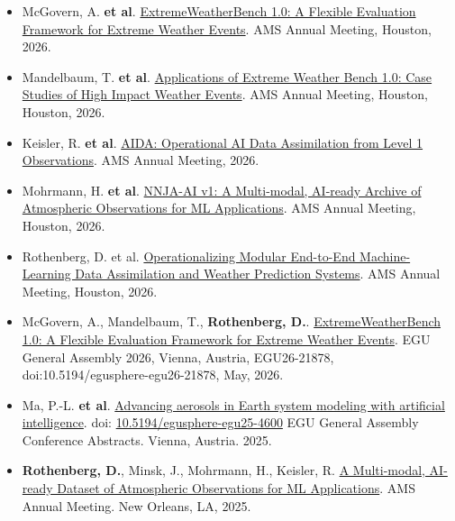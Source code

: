 \documentclass[11pt,letterpaper]{article}
\begin{document}
\begin{itemize}[itemindent=-10pt]

 \item McGovern, A. \textbf{et al}. \href{https://ams.confex.com/ams/106ANNUAL/meetingapp.cgi/Paper/477140}{ExtremeWeatherBench 1.0: A Flexible Evaluation Framework for Extreme Weather Events}. AMS Annual Meeting, Houston, 2026.
 
 \item Mandelbaum, T. \textbf{et al}. \href{https://ams.confex.com/ams/106ANNUAL/meetingapp.cgi/Paper/477141}{Applications of Extreme Weather Bench 1.0: Case Studies of High Impact Weather Events}. AMS Annual Meeting, Houston, Houston, 2026.

 \item Keisler, R. \textbf{et al}. \href{https://ams.confex.com/ams/106ANNUAL/meetingapp.cgi/Paper/473928}{AIDA: Operational AI Data Assimilation from Level 1 Observations}. AMS Annual Meeting, 2026.

 \item Mohrmann, H. \textbf{et al}. \href{https://ams.confex.com/ams/106ANNUAL/meetingapp.cgi/Paper/474971}{NNJA-AI v1: A Multi-modal, AI-ready Archive of Atmospheric Observations for ML Applications}. AMS Annual Meeting, Houston, 2026.

 \item Rothenberg, D. et al. \href{https://ams.confex.com/ams/106ANNUAL/meetingapp.cgi/Paper/476442}{Operationalizing Modular End-to-End Machine-Learning Data Assimilation and Weather Prediction Systems}. AMS Annual Meeting, Houston, 2026.

 \item McGovern, A., Mandelbaum, T., \textbf{Rothenberg, D.}. \href{https://meetingorganizer.copernicus.org/EGU26/EGU26-21878.html}{ExtremeWeatherBench 1.0: A Flexible Evaluation Framework for Extreme Weather Events}. EGU General Assembly 2026, Vienna, Austria, EGU26-21878, doi:10.5194/egusphere-egu26-21878, May, 2026.

 \item Ma, P.-L. \textbf{et al}. \href{https://doi.org/10.5194/egusphere-egu25-4600}{Advancing aerosols in Earth system modeling with artificial intelligence}. doi: \href{https://doi.org/10.5194/egusphere-egu25-4600}{10.5194/egusphere-egu25-4600} EGU General Assembly Conference Abstracts. Vienna, Austria. 2025.

 \item \textbf{Rothenberg, D.}, Minsk, J., Mohrmann, H., Keisler, R. \href{https://ams.confex.com/ams/105ANNUAL/meetingapp.cgi/Paper/452007}{A Multi-modal, AI-ready Dataset of Atmospheric Observations for ML Applications}. AMS Annual Meeting. New Orleans, LA, 2025.
 

\end{itemize}
\end{document}
